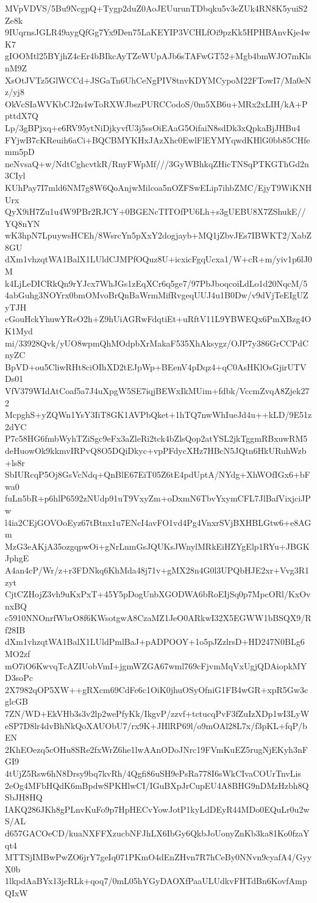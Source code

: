 MVpVDVS/5Bu9NcgpQ+Tygp2duZ0AoJEUurunTDbqku5v3eZUk4RN8K5yuiS2Ze8k
9IUqrnsJGLR49aygQfGg7Yx9Den75LaKEYIP3VCHLfOi9pzKk5HPHBAnvKje4wK7
gIOOMtl25BYjhZ4cEr4bBIkcAyTZeWUpAJb6sTAFwGT52+Mgb4bmWJO7mKlsnM9Z
XsOtJVTz5GlWCCd+JSGaTn6UhCeNgPIV8tnvKDYMCypoM22FTowI7/Ma0eNz/yj8
OkVcSIaWVKbCJ2n4wToRXWJbszPURCCodoS/0m5XB6u+MRx2xLIH/kA+PpttdX7Q
Lp/3gBPjxq+e6RV95ytNiDjkyvfU3j5ssOiEAaG5OifaiN8sdDk3xQpkaBjJHBu4
FYjwB7cKReuih6aCi+BQCBMYKHxJAzXhc0EwlFlEYMYqwdKHlG0bb85CHfemm5pD
neNvsaQ+w/NdtCghcvtkR/RnyFWpMf///3GyWBhkqZHicTNSqPTKGThGd2n3CIyl
KUhPay7I7mld6NM7g8W6QoAnjwMilcoa5nOZFSwELip7ihbZMC/EjyT9WiKNHUrx
QyX9iH7Zu1u4W9PBr2RJCY+0BGENcTITOfPU6Lh+s3gUEBU8X7ZShukE//YQ8nYN
wK3hpN7LpuywsHCEh/8WsrcYn5pXxY2dogjayb+MQ1jZbvJEs7IBWKT2/XabZ8GU
dXm1vhzqtWA1BalX1LUldCJMPfOQuz8U+icxicFgqUcxa1/W+cR+m/yiv1p6lJ0M
k4LjLeDICRkQn9rYJcx7WhJGs1zEqXCr6q5ge7/97PbJboqcoiLdLo1d20NqcM/5
4abGuhg3NOYrx0bmOMvoBrQnBaWrmMifRvgeqUUJ4u1B0Dw/v9dVjTeEIgUZyTJH
cGouHckYhuwYReO2h+Z9hUiAGRwFdqtiEt+uRftV11L9YBWEQx6PmXBzg4OK1Myd
mi/33928Qvk/yUO8wpmQhMOdpbXrMakaF535XhAksygz/OJP7y386GrCCPdCnyZC
BpVD+ou5CliwRHt8ciOIhXD2tEJpWp+BEenV4pDqz4+qC0AsHKlOsGjirUTVDs01
VfV379WIdAtCoaf5a7J4uXpgW5SE7iqjBEWxIkMUim+fdbk/VccmZvqA8Zjek272
McpghS+yZQWn1YsY3IiT8GK1AVPbQket+1hTQ7nwWhIueJd4u++kLD/9E51z2dYC
P7c58HG6fmbWyhTZiSgc9eFx3aZleRi2tck4bZlsQop2atYSL2jkTggmRBxuwRM5
deHuowOk9kkmvIRPvQ8O5DQiDkyc+vpPFdycXHz7HBcN5JQtn6HkURuhWzb+ls8r
SbIURcqP5Oj8GsVcNdq+QnBlE67EiT05Z6tE4pdUptA/NYdg+XhWOfIGx6+bFwa0
fuLn5bR+p6hlP6592zNUdp91uT9VxyZm+oDxmN6TbvYxymCFL7JlBafVixjciJPw
l4ia2CEjGOVOoEyz67tBtnx1u7ENcI4avFO1vd4Pg4VnxrSVjBXHBLGtw6+e8AGm
MzG3eAKjA35ozgqpwOi+gNrLnmGsJQUKsJWnylMRkEiHZYgElp1RYu+JBGKJphgE
A4an4cP/Wr/z+r3FDNkq6KhMda48j71v+gMX28n4G0l3UPQbHJE2xr+Vvg3R1zyt
CjtCZHojZ3vh9uKxPxT+45Y5pDogUnbXGODWA6bRoEIjSq0p7MpcORl/KxOvnxBQ
c5910NNOnrfWbrO8f6KWsotgwA8CzaMZ1JeO0ARkwI32X5EGWW1bBSQX9/Rf28IB
dXm1vhzqtWA1BalX1LUldPmlBaJ+pADPOOY+1o5pJZzlrsD+HD247N0BLg6MO2zf
mO7iO6KwvqTcAZIUobVmI+jgmWZGA67wml769cFjvmMqVxUgjQDAiopkMYD3soPc
2X7982qOP5XW++gRXcm69CdFe6c1OiK0jhuOSyOfniG1FB4wGR+xpR5Gw3cglcGB
7ZN/WD+EkVHb3s3v2lp2wePfyKk/IkgvP/zzvf+tctucqPvF3fZuIzXDp1wI3LyW
eSP7D8lr4dvBhNkQoXAUObU7/rx9K+JHlRP69l/o9mOAl28L7x/f3pKL+fqP/bEN
2KhEOezq5cOHu8SRe2fxWrZ6he1lwAAnODoJNrc19FVmKuEZ5rugNjEKyh3nFGI9
4tUjZ5Rsw6hN8Drsy9bq7kvRh/4Qgfi86uSH9ePsRa778I6sWkCIvaCOUrTnvLis
2eOg4MFbHQdK6mBpdwSPKHlwCI/IGuBXpJrCupEU4A8BHG9nDMzHzbh8QSbJH8HQ
IAKQ286JKh8gPLnvKuFo9p7HpHECvYowJotP1kyLdDEyR44MDo0EQuLr0u2wS/AL
d657GACOeCD/kuaNXFFXzucbNFJhLX6IbGy6QkbJoUonyZnKb3ka81Ko0fzaYqt4
MTTSjIMBwPwZO6jrY7geIq071PKmO4dEnZHvn7R7hCeBy0NNvn9cyafA4/GyyX0b
1lkpdAaBYx13jcRLk+qoq7/0mL05hYGyDAOXfPaaULUdkvFHTdBn6KovfAmpQIxW

